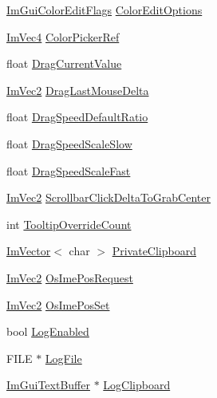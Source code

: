 \begin{DoxyCompactItemize}
\item 
\mbox{\hyperlink{imgui_8h_a6b2d5e95adc38f22c021252189f669c6}{Im\+Gui\+Color\+Edit\+Flags}} \mbox{\hyperlink{struct_im_gui_context_a122394766b40cdb6cbd8a40fbe6ac680}{Color\+Edit\+Options}}
\item 
\mbox{\hyperlink{struct_im_vec4}{Im\+Vec4}} \mbox{\hyperlink{struct_im_gui_context_ae3a119a9a71b31ede7ccc87447627b68}{Color\+Picker\+Ref}}
\item 
float \mbox{\hyperlink{struct_im_gui_context_a96ed5993aaddb183dc36244912ea261f}{Drag\+Current\+Value}}
\item 
\mbox{\hyperlink{struct_im_vec2}{Im\+Vec2}} \mbox{\hyperlink{struct_im_gui_context_a804ee75ff62a35d2955ecf7917e704f9}{Drag\+Last\+Mouse\+Delta}}
\item 
float \mbox{\hyperlink{struct_im_gui_context_aea2d961c03a1d0879088385d8cf602dd}{Drag\+Speed\+Default\+Ratio}}
\item 
float \mbox{\hyperlink{struct_im_gui_context_a69df3a201fa28cf99b6a442d506806a0}{Drag\+Speed\+Scale\+Slow}}
\item 
float \mbox{\hyperlink{struct_im_gui_context_ac12072b2fbfca44e4d8b9775cb8cfa21}{Drag\+Speed\+Scale\+Fast}}
\item 
\mbox{\hyperlink{struct_im_vec2}{Im\+Vec2}} \mbox{\hyperlink{struct_im_gui_context_a07456ba31300e2ee1cb1827dfbd02fe6}{Scrollbar\+Click\+Delta\+To\+Grab\+Center}}
\item 
int \mbox{\hyperlink{struct_im_gui_context_a1c6e3c1b866fa1abf473d3cd9eafce0f}{Tooltip\+Override\+Count}}
\item 
\mbox{\hyperlink{class_im_vector}{Im\+Vector}}$<$ char $>$ \mbox{\hyperlink{struct_im_gui_context_a4ba950183c7c5e401ca4113e09b1ced4}{Private\+Clipboard}}
\item 
\mbox{\hyperlink{struct_im_vec2}{Im\+Vec2}} \mbox{\hyperlink{struct_im_gui_context_af98a8f8b9c96bf8b692449daedf45602}{Os\+Ime\+Pos\+Request}}
\item 
\mbox{\hyperlink{struct_im_vec2}{Im\+Vec2}} \mbox{\hyperlink{struct_im_gui_context_a466a0975ad72e7e3deaea6bcfb6b446d}{Os\+Ime\+Pos\+Set}}
\item 
bool \mbox{\hyperlink{struct_im_gui_context_a2508bec1862aa4477eca2c79d6924b82}{Log\+Enabled}}
\item 
F\+I\+LE $\ast$ \mbox{\hyperlink{struct_im_gui_context_a73a73a599720fb933e4fb5e673dde131}{Log\+File}}
\item 
\mbox{\hyperlink{struct_im_gui_text_buffer}{Im\+Gui\+Text\+Buffer}} $\ast$ \mbox{\hyperlink{struct_im_gui_context_a676007461d3ce20e50a092573dc05064}{Log\+Clipboard}}

\end{DoxyCompactItemize}
